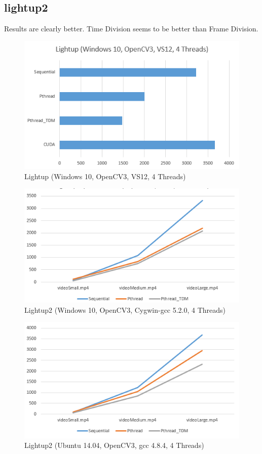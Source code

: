 \documentclass{acm_proc_article-sp}
\begin{document}
\subsection{lightup2}
Results are clearly better. Time Division seems to be better than Frame Division.
\begin{figure}[H]
  \includegraphics[width=\linewidth,natwidth=529,natheight=316]{lightup2.png}
  \caption{Lightup (Windows 10, OpenCV3, VS12, 4 Threads)}
  \label{fig:lightup2}
\end{figure}
\begin{figure}[H]
  \includegraphics[width=\linewidth,natwidth=535,natheight=285]{lightup2_sml.png}
  \caption{Lightup2 (Windows 10, OpenCV3, Cygwin-gcc 5.2.0, 4 Threads)}
  \label{fig:lightup2_sml}
\end{figure}
\begin{figure}[H]
  \includegraphics[width=\linewidth,natwidth=536,natheight=290]{lightup2_ubuntu.png}
  \caption{Lightup2 (Ubuntu 14.04, OpenCV3, gcc 4.8.4, 4 Threads)}
  \label{fig:lightup2_ubuntu}
\end{figure}
\end{document}
